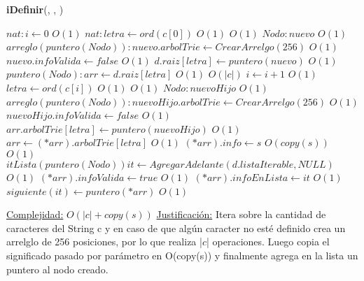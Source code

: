 \begin{algorithm}[H]{\textbf{iDefinir}(, , )}
	\begin{algorithmic}
		\State $nat: i \gets 0$ \Comment $O(1)$
		\State $nat: letra \gets ord(c[0])$ \Comment $O(1)$		
		 \Comment $O(1)$
			\State $Nodo: nuevo$ \Comment $O(1)$
			\State $arreglo(puntero(Nodo)): nuevo.arbolTrie \gets CrearArrelgo(256)$ \Comment $O(1)$
			\State $nuevo.infoValida \gets false$ \Comment $O(1)$
			\State $d.raiz[letra] \gets puntero(nuevo)$ \Comment $O(1)$
		\EndIf
		\State $puntero(Nodo): arr \gets d.raiz[letra]$ \Comment $O(1)$
		 \Comment $O(|c|)$
			\State $i \gets i + 1$ \Comment $O(1)$
			\State $letra \gets ord(c[i])$ \Comment $O(1)$
			 \Comment $O(1)$
				\State $Nodo: nuevoHijo$ \Comment $O(1)$
				\State $arreglo(puntero(Nodo)): nuevoHijo.arbolTrie \gets CrearArrelgo(256)$ \Comment $O(1)$
				\State $nuevoHijo.infoValida \gets false$ \Comment $O(1)$
				\State $arr.arbolTrie[letra] \gets puntero(nuevoHijo)$ \Comment $O(1)$
			\EndIf
			\State $arr \gets (*arr).arbolTrie[letra]$ \Comment $O(1)$
		\EndWhile
		\State $(*arr).info \gets s$ \Comment $O(copy(s))$
		 \Comment $O(1)$
			\State $itLista(puntero(Nodo)) it \gets AgregarAdelante(d.listaIterable,NULL)$ \Comment $O(1)$
			\State $(*arr).infoValida \gets true$ \Comment $O(1)$
			\State $(*arr).infoEnLista \gets it$ \Comment $O(1)$
			\State $siguiente(it) \gets puntero(*arr)$ \Comment $O(1)$
		\EndIf

		\medskip
		\Statex \underline{Complejidad:} $O(|c| + copy(s))$
		\Statex \underline{Justificación:} Itera sobre la cantidad de caracteres del String c y en caso de que algún caracter no esté definido crea un arrelglo de 256 posiciones, por lo que realiza |$c$| operaciones. Luego copia el significado pasado por parámetro en O(copy(s)) y finalmente agrega en la lista un puntero al nodo creado.
    \end{algorithmic}
\end{algorithm}


